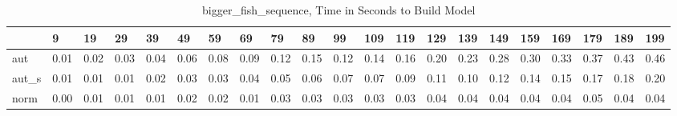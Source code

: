 \begin{table}
\caption{bigger_fish_sequence, Time in Seconds to Build Model}
\label{bigger_fish_sequence_model_time}
\begin{tabular}{lllllllllllllllllllll}
\toprule
 & 9 & 19 & 29 & 39 & 49 & 59 & 69 & 79 & 89 & 99 & 109 & 119 & 129 & 139 & 149 & 159 & 169 & 179 & 189 & 199 \\
\midrule
aut & 0.01 & 0.02 & 0.03 & 0.04 & 0.06 & 0.08 & 0.09 & 0.12 & 0.15 & 0.12 & 0.14 & 0.16 & 0.20 & 0.23 & 0.28 & 0.30 & 0.33 & 0.37 & 0.43 & 0.46 \\
aut_s & 0.01 & 0.01 & 0.01 & 0.02 & 0.03 & 0.03 & 0.04 & 0.05 & 0.06 & 0.07 & 0.07 & 0.09 & 0.11 & 0.10 & 0.12 & 0.14 & 0.15 & 0.17 & 0.18 & 0.20 \\
norm & 0.00 & 0.01 & 0.01 & 0.01 & 0.02 & 0.02 & 0.01 & 0.03 & 0.03 & 0.03 & 0.03 & 0.03 & 0.04 & 0.04 & 0.04 & 0.04 & 0.04 & 0.05 & 0.04 & 0.04 \\
\bottomrule
\end{tabular}
\end{table}
